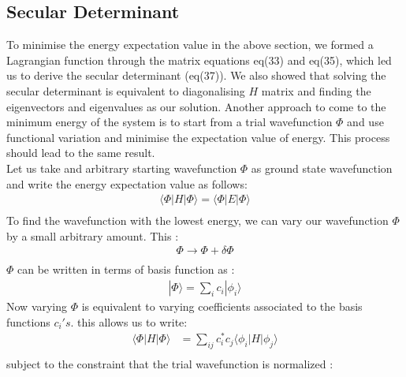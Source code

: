 \documentclass[11pt]{article}   	%
\begin{document}
	\subsection{Secular Determinant}
	To minimise the energy expectation value in the above section, we formed a Lagrangian function through the matrix equations eq(33) and eq(35), 
	which led us to derive the secular determinant (eq(37)). We also showed that solving the secular determinant is equivalent
	 to diagonalising $H$ matrix and finding the eigenvectors and eigenvalues as our solution. Another
	 approach to come to the minimum energy of the system is to start from a trial 
	wavefunction $\Phi$ and use functional variation and minimise the expectation value of energy. This process should lead to the same result. \\ 
	Let us take and arbitrary starting wavefunction $\Phi$ as ground state wavefunction and 
	write the energy expectation value as follows:\\
	\begin{equation}
	\begin{split}
		\langle\Phi|H|\Phi\rangle=\langle\Phi|E|\Phi\rangle\\
	\end{split}
	\end{equation}
	To find the wavefunction with the lowest energy, we can vary our 
	wavefunction $\Phi$ by a small arbitrary amount. This  :
	\begin{equation}
	\begin{split}
		\Phi\rightarrow\Phi+\delta\Phi\\
	\end{split}
	\end{equation}
	$\Phi$ can be written in terms of basis function as :
	\begin{equation}
	\begin{split}
		|\Phi\rangle=\sum_{i} c_{i}|\phi_{i}\rangle
	\end{split}
	\end{equation}
	Now varying $\Phi$ is equivalent to varying coefficients associated to the basis functions 
	$c_i's$.	this allows us to write:\\
	\begin{equation}
	\begin{split}
		\langle\Phi|H|\Phi\rangle&=\sum_{ij}c_i^*c_j\langle\phi_i|H|\phi_j\rangle\\
	\end{split}
	\end{equation}
	subject to the constraint that the trial wavefunction is normalized :\\
\end{document}
